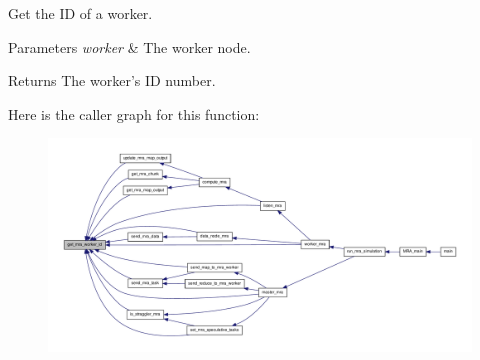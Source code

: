 \-Get the \-I\-D of a worker. 


\begin{DoxyParams}{\-Parameters}
{\em worker} & \-The worker node. \\
\hline
\end{DoxyParams}
\begin{DoxyReturn}{\-Returns}
\-The worker's \-I\-D number. 
\end{DoxyReturn}


\-Here is the caller graph for this function\-:\nopagebreak
\begin{figure}[H]
\begin{center}
\leavevmode
\includegraphics[width=350pt]{worker-mra_8h_a5c30e22e7fb9c6f78fca445efe8277f6_icgraph}
\end{center}
\end{figure}


